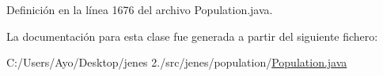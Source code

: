 Definición en la línea 1676 del archivo Population.\-java.



La documentación para esta clase fue generada a partir del siguiente fichero\-:\begin{DoxyCompactItemize}
\item 
C\-:/\-Users/\-Ayo/\-Desktop/jenes 2./src/jenes/population/\hyperlink{_population_8java}{Population.\-java}\end{DoxyCompactItemize}
